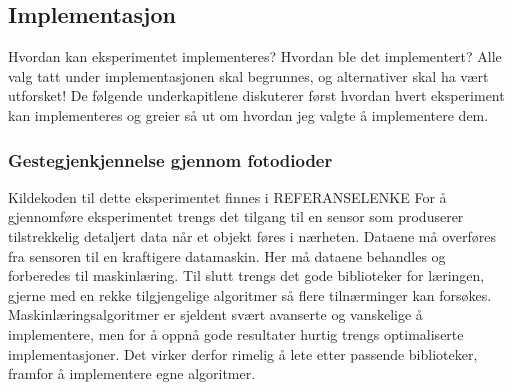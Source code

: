 \subsection{Implementasjon}
{\color{red}Hvordan kan eksperimentet implementeres? Hvordan ble det implementert? Alle valg tatt under implementasjonen skal begrunnes, og alternativer skal ha vært utforsket!}
De følgende underkapitlene diskuterer først hvordan hvert eksperiment kan implementeres og greier så ut om hvordan jeg valgte å implementere dem.

\subsubsection{Gestegjenkjennelse gjennom fotodioder}
{\color{red}Kildekoden til dette eksperimentet finnes i REFERANSELENKE}
For å gjennomføre eksperimentet trengs det tilgang til en sensor som produserer tilstrekkelig detaljert data når et objekt føres i nærheten. Dataene må overføres fra sensoren til en kraftigere datamaskin. Her må dataene behandles og forberedes til maskinlæring. Til slutt trengs det gode biblioteker for læringen, gjerne med en rekke tilgjengelige algoritmer så flere tilnærminger kan forsøkes. Maskinlæringsalgoritmer er sjeldent svært avanserte og vanskelige å implementere, men for å oppnå gode resultater hurtig trengs optimaliserte implementasjoner. Det virker derfor rimelig å lete etter passende biblioteker, framfor å implementere egne algoritmer.

